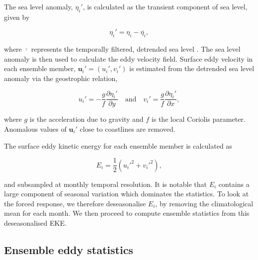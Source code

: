 \documentclass[linenumbers]{agujournal2019}
\begin{document}
The sea level anomaly, $\eta_i'$, is calculated as the transient component of sea level, given by 
\begin{linenomath*}
\begin{equation}
\eta_i' = \eta_i - \overline{\eta_i},
\end{equation}
\end{linenomath*}
where $\overline{\cdot}$ represents the temporally filtered, detrended sea level \citep{Close2020}.
The sea level anomaly is then used to calculate the eddy velocity field.
Surface eddy velocity in each ensemble member, $\mathbf{u}_i' = (u_i', v_i')$ is estimated from the detrended sea level anomaly via the geostrophic relation,
\begin{linenomath*}
\begin{equation}
u_i' = - \frac{g}{f} \frac{\partial \eta_i'}{\partial y} \quad \text{and} \quad v_i' = \frac{g}{f} \frac{\partial \eta_i'}{\partial x},
\end{equation}
\end{linenomath*}
where $g$ is the acceleration due to gravity and $f$ is the local Coriolis parameter.
Anomalous values of $\mathbf{u}_i'$ close to coastlines are removed.

The surface eddy kinetic energy for each ensemble member is calculated as 
\begin{linenomath*}
\begin{equation}
E_i = \frac{1}{2}(u_i'^2 + v_i'^2),
\end{equation}
\end{linenomath*}
and subsampled at monthly temporal resolution.
It is notable that $E_i$ contains a large component of seasonal variation \citep{Martinez-Moreno2021} which dominates the statistics.
To look at the forced response, we therefore deseasonalise $E_i$, by removing the climatological mean for each month.
We then proceed to compute ensemble statistics from this deseasonalised EKE.

\subsection{Ensemble eddy statistics}
\end{document}
